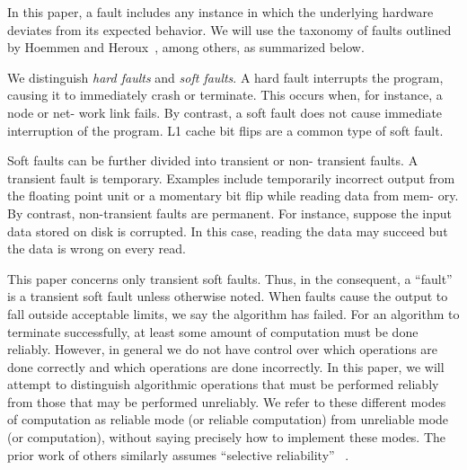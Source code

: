 


In this paper, a fault includes any instance in which the underlying
hardware deviates from its expected behavior.
We will use the taxonomy of faults outlined by Hoemmen and Heroux~\cite{hoemmen2011reliability}, 
among others, as summarized below.

%
We distinguish \emph{hard faults} and \emph{soft faults}. A hard fault interrupts the program, 
causing it to immediately crash or terminate. This occurs when, for instance, a node or net- work 
link fails. By contrast, a soft fault does not cause immediate interruption of the program. L1 cache 
bit flips
are a common type of soft fault.

%
Soft faults can be further divided into transient or non-
transient faults. A transient fault is temporary. Examples include temporarily incorrect output from 
the floating point unit or a momentary bit flip while reading data from mem- ory. By contrast, 
non-transient faults are permanent. For instance, suppose the input data stored on disk is 
corrupted. In this case, reading the data may succeed but the data is wrong on every read.


%
This paper concerns only transient soft faults. Thus, in the consequent, a ``fault'' is a transient 
soft fault unless otherwise noted. When faults cause the output to fall outside acceptable limits, 
we say the algorithm has failed.
For an algorithm to terminate successfully, at least some amount of computation must be done 
reliably. However, in general we do not have control over which operations are done correctly and 
which operations are done incorrectly. In this paper, we will attempt to distinguish algorithmic 
operations that must be performed reliably from those that may be performed unreliably. We refer to 
these different modes of computation as reliable mode (or reliable computation) from unreliable mode 
(or computation), without saying precisely how to implement these modes. The prior work of others 
similarly assumes ``selective reliability'' ~\cite{hoemmen2011reliability}.